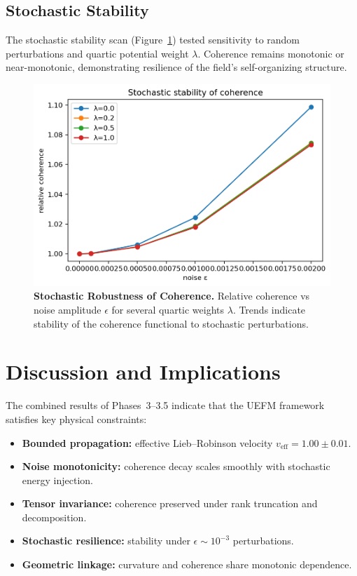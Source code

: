 \documentclass[11pt]{article}
\begin{document}
\subsection{Stochastic Stability}

The stochastic stability scan (Figure~\ref{fig:stoch-stability}) tested sensitivity to random perturbations and quartic potential weight $\lambda$. Coherence remains monotonic or near-monotonic, demonstrating resilience of the field’s self-organizing structure.

\begin{figure}[H]
  \centering
  \includegraphics[width=0.78\linewidth]{../outputs/figs/stochastic_stability.png}
  \caption{\textbf{Stochastic Robustness of Coherence.}
  Relative coherence vs noise amplitude $\epsilon$ for several quartic weights $\lambda$. Trends indicate stability of the coherence functional to stochastic perturbations.}
  \label{fig:stoch-stability}
\end{figure}

\section{Discussion and Implications}

The combined results of Phases~3–3.5 indicate that the UEFM framework satisfies key physical constraints:
\begin{itemize}
  \item \textbf{Bounded propagation:} effective Lieb–Robinson velocity $v_{\mathrm{eff}} = 1.00 \pm 0.01$.
  \item \textbf{Noise monotonicity:} coherence decay scales smoothly with stochastic energy injection.
  \item \textbf{Tensor invariance:} coherence preserved under rank truncation and decomposition.
  \item \textbf{Stochastic resilience:} stability under $\epsilon \sim 10^{-3}$ perturbations.
  \item \textbf{Geometric linkage:} curvature and coherence share monotonic dependence.
\end{itemize}
\end{document}
